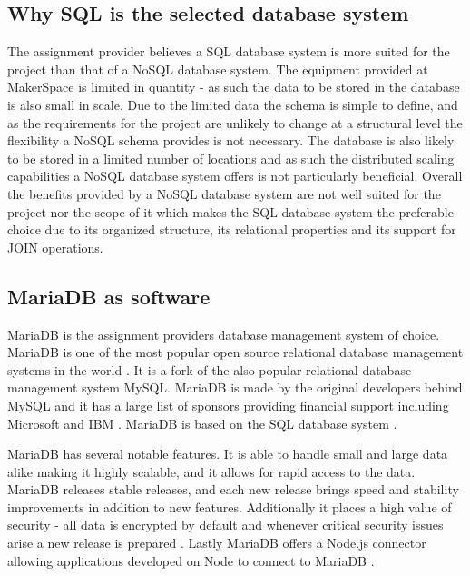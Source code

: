 \subsection{Why SQL is the selected database system}
The assignment provider believes a SQL database system is more suited for the project than that of a NoSQL database system.
The equipment provided at MakerSpace is limited in quantity - as such the data to be stored in the database is also small in scale.
Due to the limited data the schema is simple to define, and as the requirements for the project are unlikely to change at a structural level the flexibility a NoSQL schema provides is not necessary.
The database is also likely to be stored in a limited number of locations and as such the distributed scaling capabilities a NoSQL database system offers is not particularly beneficial.
Overall the benefits provided by a NoSQL database system are not well suited for the project nor the scope of it which makes the SQL database system the preferable choice due to its organized structure, its relational properties and its support for JOIN operations.

\subsection{MariaDB as software}
MariaDB is the assignment providers database management system of choice.
MariaDB is one of the most popular\cite{mariadb-foundation-about} open source relational database management systems in the world \cite{mariadb-about}.
It is a fork of the also popular relational database management system MySQL\cite{mysql-about}.
MariaDB is made by the original developers behind MySQL \cite{mariadb-foundation-about} and it has a large list of sponsors providing financial support including Microsoft and IBM \cite{mariadb-sponsors}.
MariaDB is based on the SQL database system \cite{mariadb-about-searchdatamanagement}.

MariaDB has several notable features.
It is able to handle small and large data alike making it highly scalable, and it allows for rapid access to the data.
MariaDB releases stable releases, and each new release brings speed and stability improvements in addition to new features.
Additionally it places a high value of security - all data is encrypted by default and whenever critical security issues arise a new release is prepared \cite{mariadb-about}.
Lastly MariaDB offers a Node.js connector allowing applications developed on Node to connect to MariaDB \cite{mariadb-node-connector}.

